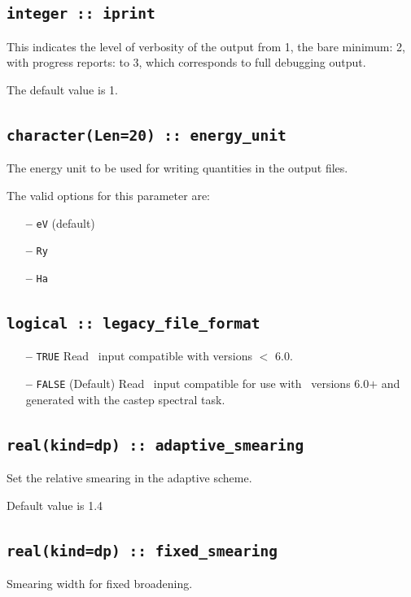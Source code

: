 \documentclass[a4paper,11pt,twoside]{book}
\begin{document}
\subsection[iprint]{\tt integer :: iprint}

This indicates the level of verbosity of the output from 1,
the bare minimum: 2, with progress reports: to 3, which corresponds to full debugging output.

The default value is 1.


\subsection[energy\_unit]{\tt character(Len=20) :: energy\_unit}
The energy unit to be used for writing quantities in the output files.

The valid options for this parameter are:
\begin{itemize}
\item[{\bf --}]  \verb#eV# (default)
\item[{\bf --}]  \verb#Ry#
\item[{\bf --}]  \verb#Ha#
\end{itemize}

\subsection[adaptive\_smearing]{\tt logical :: legacy\_file\_format}
\label{sect:lff}
\begin{itemize}
\item[{\bf --}] \verb#TRUE#  Read \castep\ input compatible with versions $<$ 6.0.
\item[{\bf --}] \verb#FALSE# (Default) Read \castep\ input compatible for use with \castep\ versions 6.0$+$ and generated with the castep spectral task.
\end{itemize}

\subsection[adaptive\_smearing]{\tt real(kind=dp) :: adaptive\_smearing}
Set the relative smearing in the adaptive scheme.

Default value is 1.4

\subsection[fixed\_smearing]{\tt real(kind=dp) :: fixed\_smearing}
Smearing width for fixed broadening.
\end{document}
